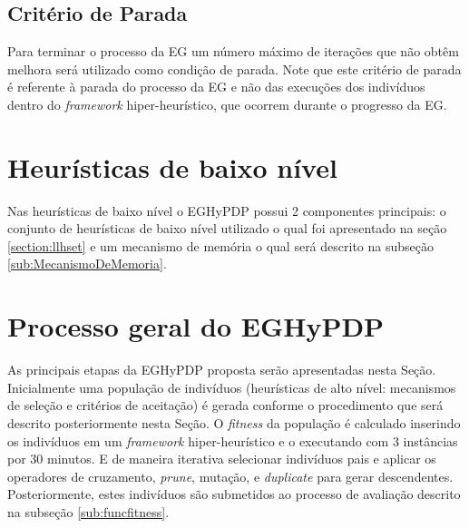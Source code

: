  
% 
%
 
 
 
   


  
  \subsection{Critério de Parada}
  \label{sub:criterioParada}
  
  Para terminar o processo da EG um número máximo de iterações que não obtêm melhora será utilizado como condição de parada. Note que este critério de parada é referente à parada do processo da EG e não das execuções dos indivíduos dentro do \textit{framework} hiper-heurístico, que ocorrem durante o progresso da EG. 
  
  
  \section{Heurísticas de baixo nível}
  
  Nas heurísticas de baixo nível o EGHyPDP possui 2 componentes principais: o conjunto de heurísticas de baixo nível utilizado o qual foi apresentado na seção \ref{section:llhset} e um mecanismo de memória o qual será descrito na subseção \ref{sub:MecanismoDeMemoria}.
  



\section{Processo geral do EGHyPDP} 

As principais etapas da EGHyPDP proposta serão apresentadas nesta Seção.
Inicialmente uma população de indivíduos (heurísticas de alto nível: mecanismos de seleção e critérios de aceitação) é gerada conforme o procedimento que será descrito posteriormente nesta Seção. O \textit{fitness} da população é calculado inserindo os indivíduos em um \textit{framework} hiper-heurístico e o executando com 3 instâncias por 30 minutos. E de maneira iterativa selecionar indivíduos pais e aplicar os operadores de cruzamento, \textit{prune}, mutação, e \textit{duplicate} para gerar descendentes. Posteriormente, estes indivíduos são submetidos ao processo de avaliação descrito na subseção \ref{sub:funcfitness}.

